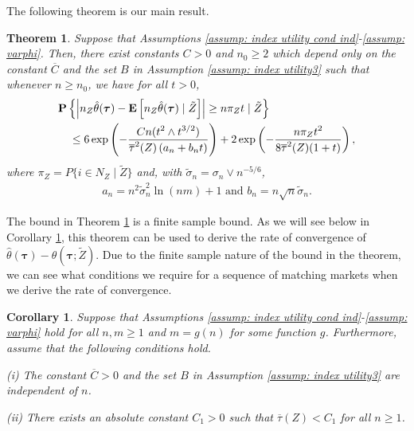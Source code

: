 \documentclass[12pt, fullpage]{amsart}
\newtheorem{theorem}{Theorem}[section]
\newtheorem{corollary}{Corollary}[section]
\theoremstyle{definition}
\theoremstyle{definition}
\theoremstyle{definition}
\begin{document}
\begin{bibunit}[econometrica]
The following theorem is our main result. 

\begin{theorem}
	\label{thm: concentration inequality}
	Suppose that Assumptions \ref{assump: index utility cond ind}-\ref{assump: varphi}. Then, there exist constants $C>0$ and $n_0 \ge 2$ which depend only on the constant $\overline C$ and the set $B$ in Assumption \ref{assump: index utility3} such that whenever $n\ge n_0$, we have for all $t > 0$,
	\begin{align}
		\label{ineq12}
		&\mathbf{P}\left\{ \left| n_Z \hat \theta(\boldsymbol{\tau}) - \mathbf{E}\left[ n_Z \hat \theta(\boldsymbol{\tau}) \mid \tilde Z \right] \right|  \ge  n \pi_Z t \mid \tilde Z \right\}\\ \notag
		&\quad \le 6 \exp\left( - \frac{\displaystyle C n (t^2 \wedge t^{3/2})}{\displaystyle \overline \tau^2(Z) \left( a_n + b_n t \right)}\right) + 2 \exp\left( - \frac{\displaystyle n \pi_Z t^2}{\displaystyle 8 \overline \tau^2(Z)(1 + t)} \right),
	\end{align}
    where $\pi_Z = P\{i \in N_Z \mid \tilde Z\}$ and, with $\tilde \sigma_n = \sigma_n \vee n^{-5/6}$,
    \begin{align*}
    	a_n = n^2 \tilde \sigma_n^2 \ln(n m) + 1 \text{ and } b_n = n \sqrt{n} \tilde \sigma_n.
    \end{align*}
\end{theorem}\medskip		

The bound in Theorem \ref{thm: concentration inequality} is a finite sample bound. As we will see below in Corollary \ref{cor: rate of convergence}, this theorem can be used to derive the rate of convergence of $\hat \theta(\boldsymbol{\tau})-\theta(\boldsymbol{\tau};\tilde Z)$. Due to the finite sample nature of the bound in the theorem, we can see what conditions we require for a sequence of matching markets when we derive the rate of convergence.

\begin{corollary}
	\label{cor: rate of convergence}
	Suppose that Assumptions \ref{assump: index utility cond ind}-\ref{assump: varphi} hold for all $n, m \ge 1$ and $m = g(n)$ for some function $g$. Furthermore, assume that the following conditions hold.\medskip
	
	(i) The constant $\overline C>0$ and the set $B$ in Assumption \ref{assump: index utility3} are independent of $n$.
	
	(ii) There exists an absolute constant $C_1>0$ such that $\overline \tau(Z)  < C_1$ for all $n \ge 1$.
	

\end{corollary}
\end{bibunit}
\end{document}
